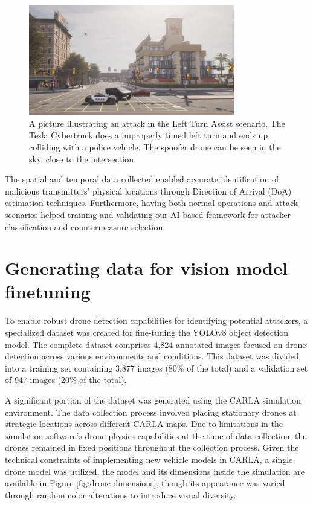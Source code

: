 \begin{figure} [!ht]
    \centering
    \includegraphics[width=0.8\textwidth]{parts/figuras/left-turn-assist-attack.png}
    \caption{A picture illustrating an attack in the Left Turn Assist scenario. The Tesla Cybertruck does a improperly timed left turn and ends up colliding with a police vehicle. The spoofer drone can be seen in the sky, close to the intersection.}
    \label{fig:left-turn-assist-attack}
\end{figure}

The spatial and temporal data collected enabled accurate identification of malicious transmitters' physical locations through Direction of Arrival (DoA) estimation techniques. Furthermore, having both normal operations and attack scenarios helped training and validating our AI-based framework for attacker classification and countermeasure selection.

\section{Generating data for vision model finetuning}

To enable robust drone detection capabilities for identifying potential attackers, a specialized dataset was created for fine-tuning the YOLOv8 object detection model. The complete dataset comprises 4,824 annotated images focused on drone detection across various environments and conditions. This dataset was divided into a training set containing 3,877 images (80\% of the total) and a validation set of 947 images (20\% of the total).

A significant portion of the dataset was generated using the CARLA simulation environment. The data collection process involved placing stationary drones at strategic locations across different CARLA maps. Due to limitations in the simulation software's drone physics capabilities at the time of data collection, the drones remained in fixed positions throughout the collection process. Given the technical constraints of implementing new vehicle models in CARLA, a single drone model was utilized, the model and its dimensions inside the simulation are available in Figure \ref{fig:drone-dimensions}, though its appearance was varied through random color alterations to introduce visual diversity.

